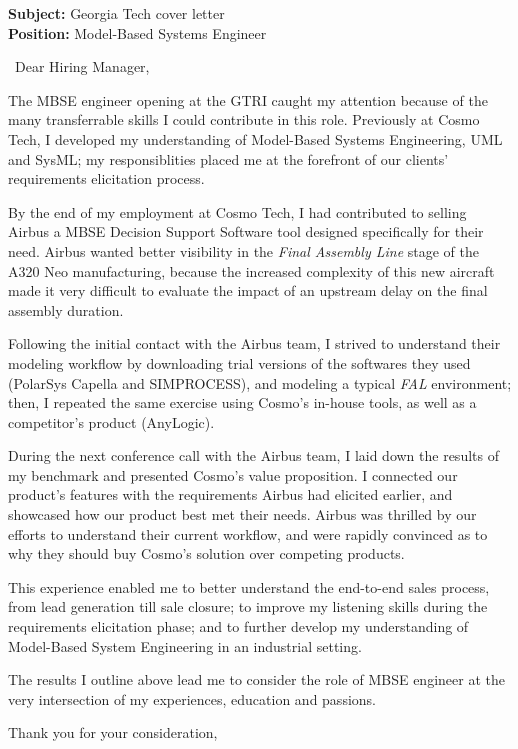 \documentclass{letter}
\begin{document}
\signature{Marius Peter}
\longindentation=0pt
\address{11090 Strathmore Dr\\Los Angeles CA 90024\\USA}


\begin{letter}{
\textbf{Subject:} Georgia Tech cover letter\\
\textbf{Position:} Model-Based Systems Engineer\\
}
\opening{\vfill~Dear Hiring Manager,}

The MBSE engineer opening at the GTRI caught my attention because of the many transferrable skills I could contribute in this role.
Previously at Cosmo Tech, I developed my understanding of Model-Based Systems Engineering, UML and SysML; my responsiblities placed me at the forefront of our clients' requirements elicitation process. 

By the end of my employment at Cosmo Tech, I had contributed to selling Airbus a MBSE Decision Support Software tool designed specifically for their need.
Airbus wanted better visibility in the \textit{Final Assembly Line} stage of the A320 Neo manufacturing, because the increased complexity of this new aircraft made it very difficult to evaluate the impact of an upstream delay on the final assembly duration.

Following the initial contact with the Airbus team, I strived to understand their modeling workflow by downloading trial versions of the softwares they used (PolarSys Capella and SIMPROCESS), and modeling a typical \textit{FAL} environment;
then, I repeated the same exercise using Cosmo's in-house tools, as well as a competitor's product (AnyLogic).

During the next conference call with the Airbus team, I laid down the results of my benchmark and presented Cosmo's value proposition.
I connected our product's features with the requirements Airbus had elicited earlier, and showcased how our product best met their needs.
Airbus was thrilled by our efforts to understand their current workflow, and were rapidly convinced as to why they should buy Cosmo's solution over competing products.

This experience enabled me to better understand the end-to-end sales process, from lead generation till sale closure;
to improve my listening skills during the requirements elicitation phase;
and to further develop my understanding of Model-Based System Engineering in an industrial setting. 

The results I outline above lead me to consider the role of MBSE engineer at the very intersection of my experiences, education and passions.

\closing{Thank you for your consideration,}

\end{letter}
\end{document}
